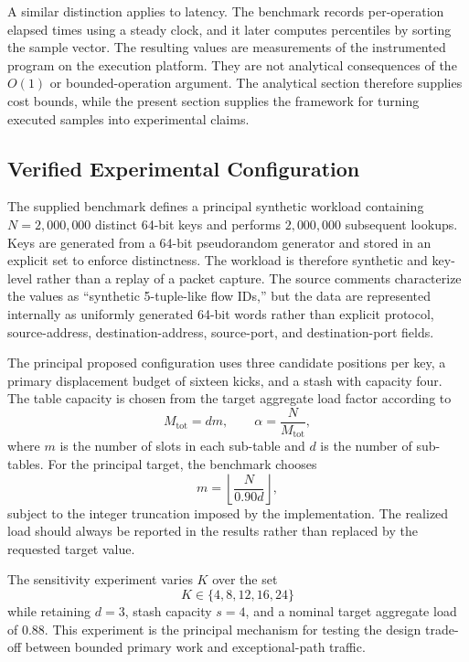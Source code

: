 \documentclass[conference]{IEEEtran}
\begin{document}
A similar distinction applies to latency. The benchmark records per-operation elapsed times using a steady clock, and it later computes percentiles by sorting the sample vector. The resulting values are measurements of the instrumented program on the execution platform. They are not analytical consequences of the $O(1)$ or bounded-operation argument. The analytical section therefore supplies cost bounds, while the present section supplies the framework for turning executed samples into experimental claims.

\subsection{Verified Experimental Configuration}
\label{subsec:verified_configuration}

The supplied benchmark defines a principal synthetic workload containing $N=2{,}000{,}000$ distinct 64-bit keys and performs $2{,}000{,}000$ subsequent lookups. Keys are generated from a 64-bit pseudorandom generator and stored in an explicit set to enforce distinctness. The workload is therefore synthetic and key-level rather than a replay of a packet capture. The source comments characterize the values as ``synthetic 5-tuple-like flow IDs,'' but the data are represented internally as uniformly generated 64-bit words rather than explicit protocol, source-address, destination-address, source-port, and destination-port fields.

The principal proposed configuration uses three candidate positions per key, a primary displacement budget of sixteen kicks, and a stash with capacity four. The table capacity is chosen from the target aggregate load factor according to
\begin{equation}
M_{\mathrm{tot}} = d m,
\qquad
\alpha = \frac{N}{M_{\mathrm{tot}}},
\label{eq:aggregate-load}
\end{equation}
where $m$ is the number of slots in each sub-table and $d$ is the number of sub-tables. For the principal target, the benchmark chooses
\begin{equation}
m = \left\lfloor \frac{N}{0.90d} \right\rfloor,
\label{eq:principal-capacity}
\end{equation}
subject to the integer truncation imposed by the implementation. The realized load should always be reported in the results rather than replaced by the requested target value.

The sensitivity experiment varies $K$ over the set
\begin{equation}
K \in \{4,8,12,16,24\}
\label{eq:k-sensitivity}
\end{equation}
while retaining $d=3$, stash capacity $s=4$, and a nominal target aggregate load of $0.88$. This experiment is the principal mechanism for testing the design trade-off between bounded primary work and exceptional-path traffic.
\end{document}
